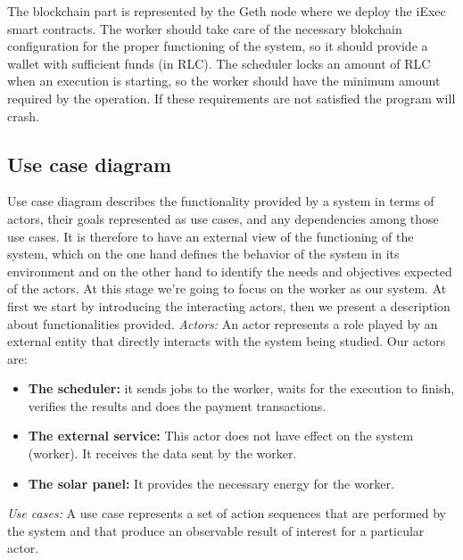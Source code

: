         The blockchain part is represented by the Geth node where we deploy the iExec smart contracts.
        The worker should take care of the necessary blokchain configuration for the proper functioning
        of the system, so it should provide a wallet with sufficient funds (in RLC). The scheduler locks
        an amount of RLC when an execution is starting, so the worker should have the minimum amount
        required by the operation. If these requirements are not satisfied the program will crash.

    \subsection{Use case diagram}
        Use case diagram describes the functionality provided by a system in terms of actors, their
        goals represented as use cases, and any dependencies among those use cases.
        It is therefore to have an external view of the functioning of the system, which on the one hand
        defines the behavior of the system in its environment and on the other hand to identify the needs
        and objectives expected of the actors. At this stage we're going to focus on the worker as our
        system. \newline
        At first we start by introducing the interacting actors, then we present a description about
        functionalities provided. \newline \newline
        \textit{Actors: }
        An actor represents a role played by an external entity that directly interacts with the system
        being studied. Our actors are:
        \begin{itemize}
            \item \textbf{The scheduler: }
            it sends jobs to the worker, waits for the execution to finish, verifies the results and does
            the payment transactions.
            \item \textbf{The external service: }
            This actor does not have effect on the system (worker). It receives the data sent by the worker.
            \item \textbf{The solar panel: }
            It provides the necessary energy for the worker.
        \end{itemize}
        \textit{Use cases: }
        A use case represents a set of action sequences that are performed by the system and that produce
        an observable result of interest for a particular actor.

